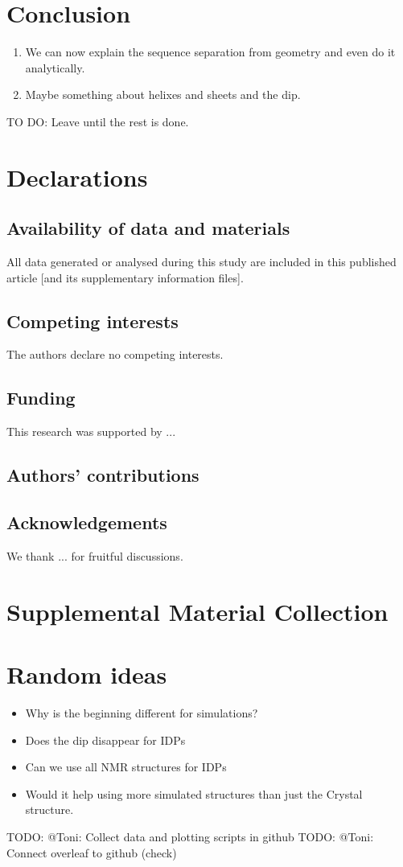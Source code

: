 \documentclass[reprint,amsmath,amssymb,rmp,onecolumn,notitlepage,11pt]{revtex4-1}
\newcommand{\green}[1]{\textcolor{green!70!black}{#1}}
\begin{document}
\section*{Conclusion}
\begin{enumerate}
    \item We can now explain the sequence separation from geometry and even do it analytically.
    \item Maybe something about helixes and sheets and the dip.
\end{enumerate}
TO DO: Leave until the rest is done.
\section*{Declarations}
\subsection{Availability of data and materials}
All data generated or analysed during this study are included in this published article [and its supplementary information files].
\subsection{Competing interests}
The authors declare no competing interests.
\subsection{Funding}
This research was supported by ...
\subsection{Authors' contributions}

\subsection{Acknowledgements}
We thank ... for fruitful discussions.




\appendix
\section{Supplemental Material Collection}
\section{Random ideas}
\begin{itemize}
    \item Why is the beginning different for simulations?
    \item Does the dip disappear for IDPs
    \item Can we use all NMR structures for IDPs
    \item Would it help using more simulated structures than just the Crystal structure. 
\end{itemize}
TODO: @Toni: Collect data and plotting scripts in github
TODO: @Toni: Connect overleaf to github \green{(check)}
\end{document}
